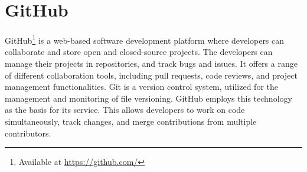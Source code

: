 \section{GitHub}
GitHub\footnote{Available at \url{https://github.com/}} is a web-based software development platform where developers can collaborate and store open and closed-source projects. The developers can manage their projects in repositories, and track bugs and issues. It offers a range of different collaboration tools, including pull requests, code reviews, and project management functionalities. Git is a version control system, utilized for the management and monitoring of file versioning. GitHub employs this technology as the basis for its service. This allows developers to work on code simultaneously, track changes, and merge contributions from multiple contributors.\cite{github}

